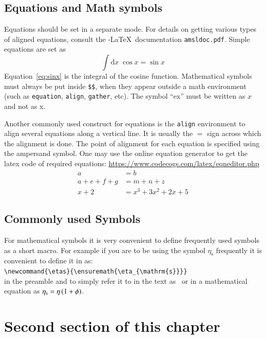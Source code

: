 \subsection{Equations and Math symbols}


Equations should be set in a separate mode.  For details on getting
various types of aligned equations, consult the \AmS-\LaTeX\
documentation \verb|amsldoc.pdf|. Simple equations are set as
\begin{equation}
\label{eq:sinx}
\int \mathrm{d}x \; \cos x =  \sin x
\end{equation}
Equation~\eqref{eq:sinx} is the integral of the cosine
function. Mathematical symbols must always be put inside \verb|$$|,
when they appear outside a math environment (such as \verb|equation|,
\verb|align|, \verb|gather|, etc).  The symbol ``ex'' must be written as
$x$ and not as x.  

Another commonly used construct for equations is the \verb|align|
environment to align several equations along a vertical line. It is
usually the $=$ sign across which the alignment is done.  The
point of alignment for each equation is specified using the ampersand symbol. One may use the online equation generator to get the latex code of required equations: \url{https://www.codecogs.com/latex/eqneditor.php} 
\begin{align}
a &= b  \\
a + e + f + g & = m + n + z \\
x + 2 & = x^{3} + 3 x^{2} + 2 x + 5
\end{align}

\subsection{Commonly used Symbols}
For mathematical symbols it is very convenient to define frequently
used symbols as a short macro. For example if you are to be using the
symbol $\eta_{\mathrm{s}}$ frequently it is convenient to define it in
as:\\
\verb|\newcommand{\etas}{\ensuremath{\eta_{\mathrm{s}}}}| \\
in the preamble and to simply refer it to in the text as \etas\ or in
a mathematical equation as $\etas = \eta \, ( 1 + \phi)$.
%

\section{Second section of this chapter} 




